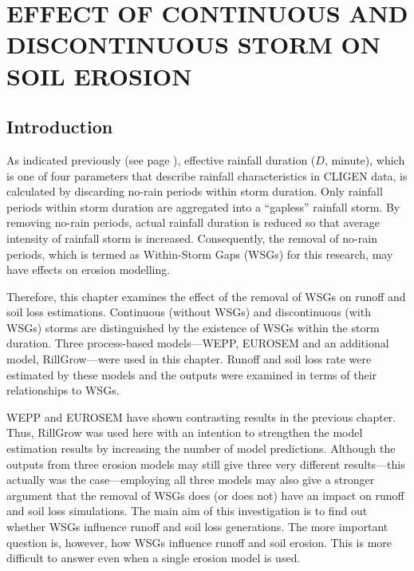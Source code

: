 \chapter{EFFECT OF CONTINUOUS AND DISCONTINUOUS STORM ON SOIL EROSION}
\label{sec:EFFECTSOFCONTINOUSANDDISCONTINUSSTORM}

\section{Introduction}
\label{sec:ContinousAndDiscontinousStormIntroduction}

As indicated previously (see page \pageref{sec:ClimateGeneratorCLIGEN}),
effective rainfall duration ($D$, minute), which
is one of four parameters that describe rainfall characteristics in CLIGEN
data, is calculated by discarding no-rain periods within storm duration. Only
rainfall periods within storm duration are aggregated into a ``gapless''
rainfall storm. By removing no-rain periods, actual rainfall duration is
reduced so that average intensity of rainfall storm is increased. Consequently,
the removal of no-rain periods, which is termed as Within-Storm Gaps (WSGs) for
this research, may have effects on erosion modelling.

Therefore, this chapter examines the effect of the removal of WSGs on
runoff and soil loss estimations. Continuous (without WSGs) and discontinuous
(with WSGs) storms are distinguished by the existence of WSGs within the storm
duration. Three process-based models---WEPP, EUROSEM and an additional model,
RillGrow---were used in this chapter. Runoff and soil loss rate were estimated
by these models and the outputs were examined in terms of their relationships to
WSGs.

WEPP and EUROSEM have shown contrasting results in the previous chapter. Thus,
RillGrow was used here with an intention to strengthen the model estimation
results by increasing the number of model predictions. Although the outputs from
three erosion models may still give three very different results---this actually
was the case---employing all three models may also give a stronger argument that
the removal of WSGs does (or does not) have an impact on runoff and soil loss
simulations.
The main aim of this investigation is to find out whether WSGs influence runoff
and soil loss generations. The more important question is, however, how WSGs
influence runoff and soil erosion. This is more difficult to answer even when a
single erosion model is used.

